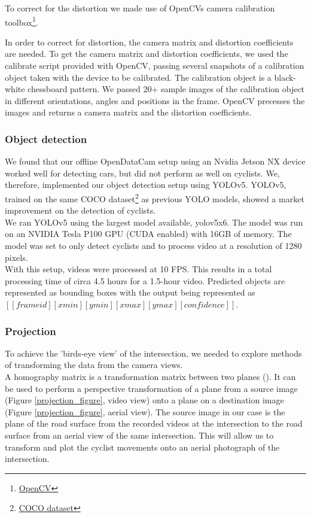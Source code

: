 To correct for the distortion we made use of OpenCVs camera calibration toolbox\footnote{\href{https://github.com/opencv/opencv}{OpenCV}}.

In order to correct for distortion, the camera matrix and distortion coefficients are needed. To get the camera matrix and distortion coefficients, we used the calibrate script provided with OpenCV,
passing several snapshots of a calibration object taken with the device to be calibrated. The calibration object is a black-white chessboard pattern.
We passed 20+ sample images of the calibration object in different orientations, angles and positions in the frame. 
OpenCV precesses the images and returns a camera matrix and the distortion coefficients.
\ \\

\subsubsection{Object detection}
We found that our offline OpenDataCam setup using an Nvidia Jetson NX device worked well for detecting cars, 
but did not perform as well on cyclists. 
We, therefore, implemented our object detection setup using YOLOv5. YOLOv5, trained on the same COCO dataset\footnote{\href{https://cocodataset.org}{COCO dataset}}
as previous YOLO models, showed a market improvement on the detection of
cyclists.
\ \\ 

We ran  YOLOv5 using the largest model available, yolov5x6.
The model was run on an NVIDIA Tesla P100 GPU (CUDA enabled) with 16GB of memory. The model was set to only detect cyclists and to process
video at a resolution of 1280 pixels.
\ \\
 
With this setup, videos were processed at 10 FPS. This results in a total processing time of circa 4.5 hours for a 1.5-hour video.
Predicted objects are represented as bounding boxes with the output being represented as $[[frame id][xmin][ymin][xmax][ymax][confidence]]$.

\subsubsection{Projection}
To achieve the 'birds-eye view' of the intersection, we needed to explore methods of 
transforming the data from the camera views.  
\ \\
A homography matrix is a transformation matrix between two planes (\cite{hartley_zisserman_2004}). It 
can be used to perform a perspective transformation of a plane from a source image (Figure \ref{projection_figure}, video view) onto 
a plane on a destination image (Figure \ref{projection_figure}, aerial view).
The source image in our case is the plane of the road surface from the recorded videos at the intersection 
to the road surface from an aerial view of the same intersection. 
This will allow us to transform and plot the cyclist movements onto an aerial photograph of the intersection.
\ \\ 

